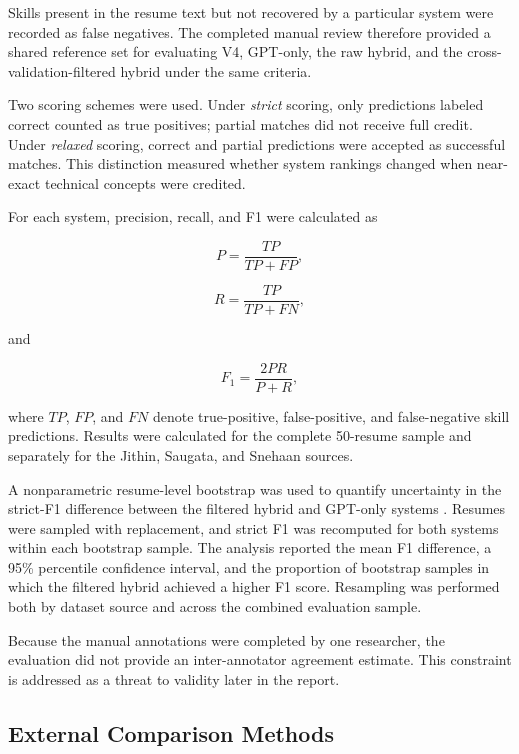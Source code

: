 \documentclass[conference]{IEEEtran}
\begin{document}
Skills present in the resume text but not recovered by a particular
system were recorded as false negatives. The completed manual review
therefore provided a shared reference set for evaluating V4, GPT-only,
the raw hybrid, and the cross-validation-filtered hybrid under the same
criteria.

Two scoring schemes were used. Under \emph{strict} scoring, only
predictions labeled correct counted as true positives; partial matches
did not receive full credit. Under \emph{relaxed} scoring, correct and
partial predictions were accepted as successful matches. This
distinction measured whether system rankings changed when near-exact
technical concepts were credited.

For each system, precision, recall, and F1 were calculated as

\begin{equation}
P = \frac{TP}{TP+FP},
\end{equation}

\begin{equation}
R = \frac{TP}{TP+FN},
\end{equation}

and

\begin{equation}
F_1 = \frac{2PR}{P+R},
\end{equation}

where \(TP\), \(FP\), and \(FN\) denote true-positive, false-positive,
and false-negative skill predictions. Results were calculated for the
complete 50-resume sample and separately for the Jithin, Saugata, and
Snehaan sources.

A nonparametric resume-level bootstrap was used to quantify uncertainty
in the strict-F1 difference between the filtered hybrid and GPT-only
systems \cite{efron1993bootstrap}. Resumes were sampled with replacement,
and strict F1 was recomputed for both systems within each bootstrap
sample. The analysis reported the mean F1 difference, a 95\% percentile
confidence interval, and the proportion of bootstrap samples in which
the filtered hybrid achieved a higher F1 score. Resampling was
performed both by dataset source and across the combined evaluation
sample.

Because the manual annotations were completed by one researcher, the
evaluation did not provide an inter-annotator agreement estimate. This
constraint is addressed as a threat to validity later in the report.

\subsection{External Comparison Methods}
\end{document}
